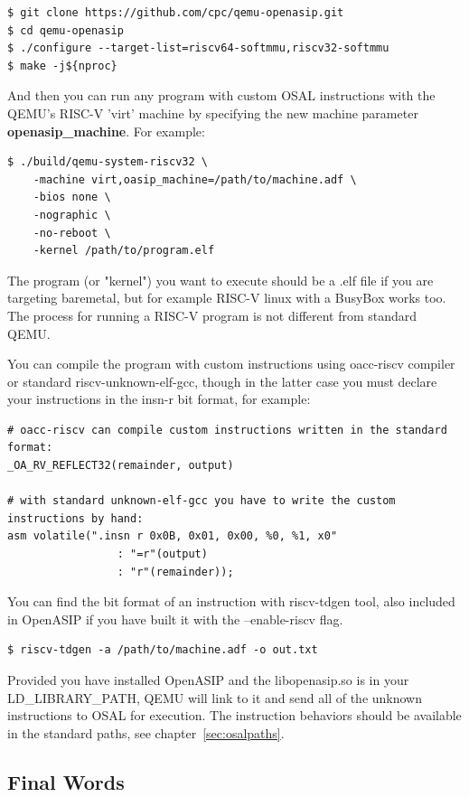 \documentclass[a4paper,twoside]{tceusermanual}
\begin{document}
\begin{verbatim}
$ git clone https://github.com/cpc/qemu-openasip.git
$ cd qemu-openasip 
$ ./configure --target-list=riscv64-softmmu,riscv32-softmmu
$ make -j${nproc}
\end{verbatim}

And then you can run any program with custom OSAL instructions with the QEMU's
RISC-V 'virt' machine by specifying the new machine parameter \textbf{openasip\_machine}.
For example:

\begin{verbatim}
$ ./build/qemu-system-riscv32 \
    -machine virt,oasip_machine=/path/to/machine.adf \
    -bios none \
    -nographic \
    -no-reboot \
    -kernel /path/to/program.elf
\end{verbatim}

The program (or "kernel") you want to execute should be a .elf file if you are targeting 
baremetal, but for example RISC-V linux with a BusyBox works too. The process 
for running a RISC-V program is not different from standard QEMU.

You can compile the program with custom instructions using oacc-riscv compiler 
or standard riscv-unknown-elf-gcc, though in the latter case you must declare 
your instructions in the insn-r bit format, for example:

\begin{verbatim}
# oacc-riscv can compile custom instructions written in the standard format:
_OA_RV_REFLECT32(remainder, output)

# with standard unknown-elf-gcc you have to write the custom instructions by hand:
asm volatile(".insn r 0x0B, 0x01, 0x00, %0, %1, x0"
                 : "=r"(output)
                 : "r"(remainder));
\end{verbatim}

You can find the bit format of an instruction with riscv-tdgen tool, also included 
in OpenASIP if you have built it with the --enable-riscv flag.
\begin{verbatim}
$ riscv-tdgen -a /path/to/machine.adf -o out.txt
\end{verbatim}

Provided you have installed OpenASIP and the libopenasip.so is in your LD\_LIBRARY\_PATH,
QEMU will link to it and send all of the unknown instructions to OSAL for execution.
The instruction behaviors should be available in the standard paths, 
see chapter~\ref{sec:osalpaths}.

\subsection{Final Words}
\end{document}
